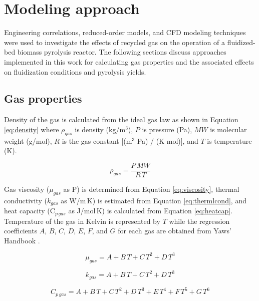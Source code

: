 
\section{Modeling approach}

Engineering correlations, reduced-order models, and CFD modeling techniques were used to investigate the effects of recycled gas on the operation of a fluidized-bed biomass pyrolysis reactor. The following sections discuss approaches implemented in this work for calculating gas properties and the associated effects on fluidization conditions and pyrolysis yields.


\subsection{Gas properties}

Density of the gas is calculated from the ideal gas law as shown in Equation \ref{eq:density} where $\rho_{gas}$ is density (kg/m$^3$), $P$ is pressure (Pa), $MW$ is molecular weight (g/mol), $R$ is the gas constant [(m$^3$ Pa) / (K mol)], and $T$ is temperature (K).

\begin{equation}\label{eq:density}
    \rho_{gas} = \frac{P\,MW}{R\,T}
\end{equation}

Gas viscosity ($\mu_{gas}$ as \textmugreek P) is determined from Equation \ref{eq:viscosity}, thermal conductivity ($k_{gas}$ as W/m\,K) is estimated from Equation \ref{eq:thermlcond}, and heat capacity (C$_{p\,gas}$ as J/mol\,K) is calculated from Equation \ref{eq:heatcap}. Temperature of the gas in Kelvin is represented by $T$ while the regression coefficients $A$, $B$, $C$, $D$, $E$, $F$, and $G$ for each gas are obtained from Yaws' Handbook \cite{Yaws2014}.

\begin{equation}\label{eq:viscosity}
    \mu_{gas} = A + B\,T + C\,T^2 + D\,T^3
\end{equation}

\begin{equation}\label{eq:thermlcond}
    k_{gas} = A + B\,T + C\,T^2 + D\,T^3
\end{equation}

\begin{equation}\label{eq:heatcap}
    C_{p\,gas} = A + B\,T + C\,T^2 + D\,T^3 + E\,T^4 + F\,T^5 + G\,T^6
\end{equation}

